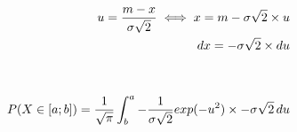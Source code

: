 \documentclass[preview]{standalone}
\begin{document}
\begin{align*}
u = {{m-x} \over {\sigma \sqrt{2}} }\iff x = m - \sigma \sqrt{2} \times u\\dx = - \sigma \sqrt{2} \times du\\ \\ \\ P( X \in [a;b] ) = { \frac{1}{\sqrt{\pi}} } \int_b^a { { - \frac{1}{\sigma \sqrt{2}} } exp( -u^2 ) \times - \sigma \sqrt{2}} \, du
\end{align*}
\end{document}

